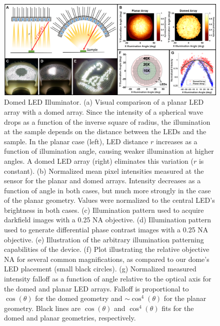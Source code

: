 \begin{figure} [ht]
\begin{center}
\includegraphics[width=\textwidth]{figures/fig_ccs_dome.png}
\end{center}
\caption {{ Domed LED Illuminator.}
{(a)} Visual comparison of a planar LED array with a domed array. Since the intensity of a spherical wave drops as a function of the inverse square of radius, the illumination at the sample depends on the distance between the LEDs and the sample. In the planar case (left), LED distance $r$ increases as a function of illumination angle, causing weaker illumination at higher angles. A domed LED array (right) eliminates this variation ($r$ is constant).
{(b)} Normalized mean pixel intensities measured at the sensor for the planar and domed arrays. Intensity decreases as a function of angle in both cases, but much more strongly in the case of the planar geometry. Values were normalized to the central LED's brightness in both cases.
{(c)} Illumination pattern used to acquire darkfield images with a 0.25 NA objective.
{(d)} Illumination pattern used to generate differential phase contrast images with a 0.25 NA objective.
{(e)} Illustration of the arbitrary illumination patterning capabilities of the device.
{(f)} Plot illustrating the relative objective NA for several common magnifications, as compared to our dome's LED placement (small black circles).
{(g)} Normalized measured intensity falloff as a function of angle relative to the optical axis for the domed and planar LED arrays. Falloff is proportional to $\cos(\theta)$ for the domed geometry and $\sim\cos^4(\theta)$ for the planar geometry. Black lines are $\cos(\theta)$ and $\cos^4(\theta)$ fits for the domed and planar geometries, respectively.
}
\label{fig:fabrication_ccs_dome}
\end{figure}


